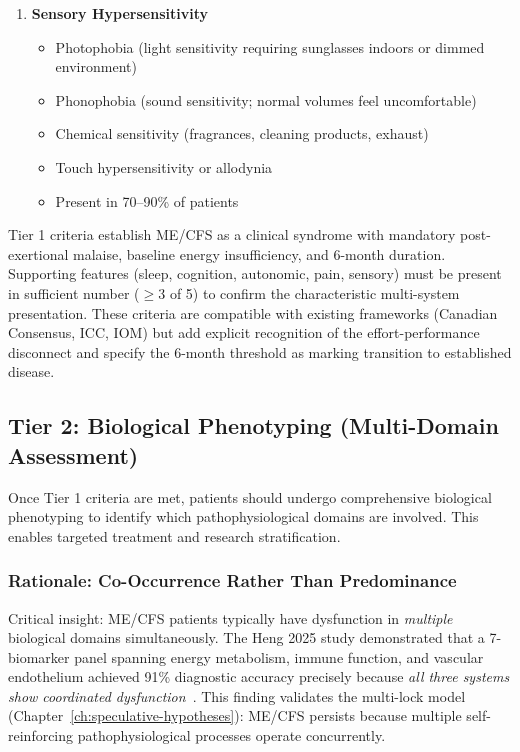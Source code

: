 \begin{enumerate}
    \item \textbf{Sensory Hypersensitivity}
    \begin{itemize}
        \item Photophobia (light sensitivity requiring sunglasses indoors or dimmed environment)
        \item Phonophobia (sound sensitivity; normal volumes feel uncomfortable)
        \item Chemical sensitivity (fragrances, cleaning products, exhaust)
        \item Touch hypersensitivity or allodynia
        \item Present in 70--90\% of patients~\cite{Jason2013sensory}
    \end{itemize}
\end{enumerate}

\begin{observation}
Tier 1 criteria establish ME/CFS as a clinical syndrome with mandatory post-exertional malaise, baseline energy insufficiency, and 6-month duration. Supporting features (sleep, cognition, autonomic, pain, sensory) must be present in sufficient number ($\geq$3 of 5) to confirm the characteristic multi-system presentation. These criteria are compatible with existing frameworks (Canadian Consensus, ICC, IOM) but add explicit recognition of the effort-performance disconnect and specify the 6-month threshold as marking transition to established disease.
\end{observation}

\subsection{Tier 2: Biological Phenotyping (Multi-Domain Assessment)}
\label{subsec:tier2}

Once Tier 1 criteria are met, patients should undergo comprehensive biological phenotyping to identify which pathophysiological domains are involved. This enables targeted treatment and research stratification.

\subsubsection{Rationale: Co-Occurrence Rather Than Predominance}

Critical insight: ME/CFS patients typically have dysfunction in \textit{multiple} biological domains simultaneously. The Heng 2025 study demonstrated that a 7-biomarker panel spanning energy metabolism, immune function, and vascular endothelium achieved 91\% diagnostic accuracy precisely because \textit{all three systems show coordinated dysfunction}~\cite{heng2025mecfs}. This finding validates the multi-lock model (Chapter~\ref{ch:speculative-hypotheses}): ME/CFS persists because multiple self-reinforcing pathophysiological processes operate concurrently.

